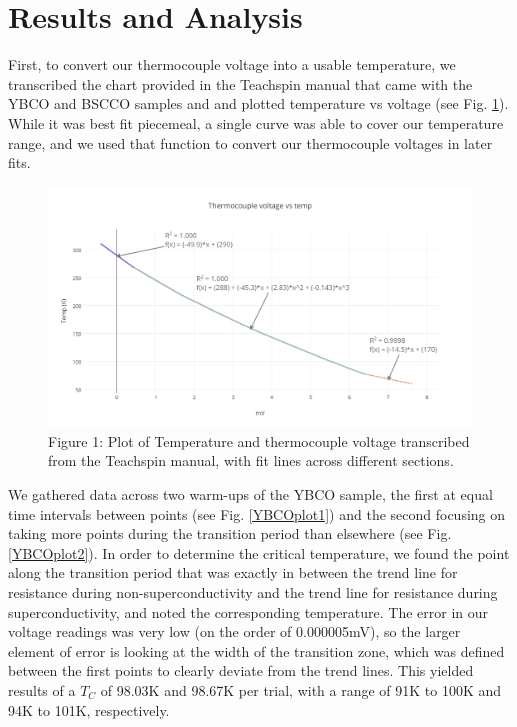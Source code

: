 \documentclass[prb,preprint]{revtex4-1}
\begin{document}
\section{Results and Analysis}

First, to convert our thermocouple voltage into a usable temperature, we transcribed the chart provided in the Teachspin manual that came with the YBCO and BSCCO samples and and plotted temperature vs voltage (see Fig. \ref{TCplot}). While it was best fit piecemeal, a single curve was able to cover our temperature range, and we used that function to convert our thermocouple voltages in later fits.

\begin{figure}[h!]
\centering
\includegraphics[width=7in]{thermocouple_voltage_vs_temp.png}
\caption{Figure 1: Plot of Temperature and thermocouple voltage transcribed from the Teachspin manual, with fit lines across different sections.}
\label{TCplot}
\end{figure}

We gathered data across two warm-ups of the YBCO sample, the first at equal time intervals between points (see Fig. \ref{YBCOplot1}) and the second focusing on taking more points during the transition period than elsewhere (see Fig. \ref{YBCOplot2}). In order to determine the critical temperature, we found the point along the transition period that was exactly in between the trend line for resistance during non-superconductivity and the trend line for resistance during superconductivity, and noted the corresponding temperature. The error in our voltage readings was very low (on the order of 0.000005mV), so the larger element of error is looking at the width of the transition zone, which was defined between the first points to clearly deviate from the trend lines. This yielded results of a $T_C$ of 98.03K and 98.67K per trial, with a range of 91K to 100K and 94K to 101K, respectively.
\end{document}
